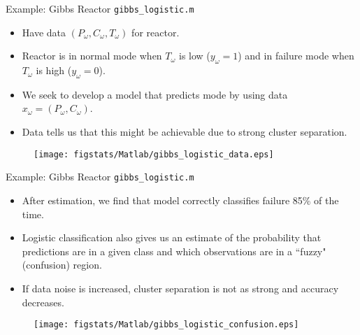 \documentclass[9pt]{beamer}
\begin{document}
%
\begin{frame}{Example: Gibbs Reactor \footnotesize{\texttt{gibbs\_logistic.m}}}

\begin{itemize}
  \setlength{\itemsep}{10pt}
\item Have data $(P_\omega,C_\omega,T_\omega)$ for reactor.
\item Reactor is in normal mode when $T_\omega$ is low ($y_\omega=1$) and in failure mode when $T_\omega$ is high ($y_\omega=0$).
\item We seek to develop a model that predicts mode by using data $x_\omega=(P_\omega,C_\omega)$. 
\item Data tells us that this might be achievable due to strong cluster separation.
\end{itemize}

\begin{figure}[!htb]
    \centering
	\texttt{[image: figstats/Matlab/gibbs\_logistic\_data.eps]}
\end{figure}

\end{frame}

%
\begin{frame}{Example: Gibbs Reactor \footnotesize{\texttt{gibbs\_logistic.m}}}

\begin{itemize}
  \setlength{\itemsep}{10pt}
\item After estimation, we find that model correctly classifies failure 85\% of the time. 
\item Logistic classification also gives us an estimate of the probability that predictions are in a given class and which observations are in a ``fuzzy" (confusion) region. 
\item If data noise is increased, cluster separation is not as strong and accuracy decreases. 
\end{itemize}

\begin{figure}[!htb]
    \centering
	\texttt{[image: figstats/Matlab/gibbs\_logistic\_confusion.eps]}
\end{figure}



\end{frame}
\end{document}
